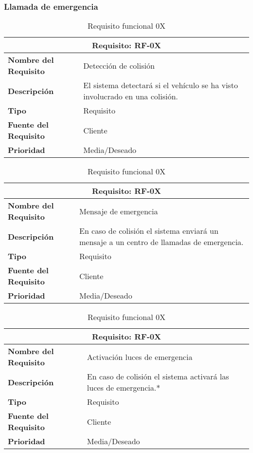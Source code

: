 \documentclass[10pt,a4paper,oldfontcommands]{dpds}
\begin{document}
\subsubsection{Llamada de emergencia}

\begin{table}[H]
\begin{center}
\begin{tabular}{p{} p{7cm}}
\multicolumn{2}{c}{\textbf{Requisito: RF-0X} } \\
\hline \hline
\textbf{Nombre del Requisito} & Detección de colisión\\
\textbf{Descripción} &El sistema detectará si el vehículo se ha visto involucrado en una colisión.\\
\textbf{Tipo} & Requisito  \\
\textbf{Fuente del Requisito} & Cliente  \\
\textbf{Prioridad} & Media/Deseado  \\ \hline
\end{tabular}
\caption{Requisito funcional 0X}
\label{tab:personal}
\end{center}
\end{table}

\begin{table}[H]
\begin{center}
\begin{tabular}{p{} p{7cm}}
\multicolumn{2}{c}{\textbf{Requisito: RF-0X} } \\
\hline \hline
\textbf{Nombre del Requisito} & Mensaje de emergencia\\
\textbf{Descripción} &En caso de colisión el sistema enviará un mensaje a un centro de llamadas de emergencia.\\
\textbf{Tipo} & Requisito  \\
\textbf{Fuente del Requisito} & Cliente  \\
\textbf{Prioridad} & Media/Deseado  \\ \hline
\end{tabular}
\caption{Requisito funcional 0X}
\label{tab:personal}
\end{center}
\end{table}

\begin{table}[H]
\begin{center}
\begin{tabular}{p{} p{7cm}}
\multicolumn{2}{c}{\textbf{Requisito: RF-0X} } \\
\hline \hline
\textbf{Nombre del Requisito} & Activación luces de emergencia\\
\textbf{Descripción} & En caso de colisión el sistema activará las luces de emergencia.*\\
\textbf{Tipo} & Requisito  \\
\textbf{Fuente del Requisito} & Cliente  \\
\textbf{Prioridad} & Media/Deseado  \\ \hline
\end{tabular}
\caption{Requisito funcional 0X}
\label{tab:personal}
\end{center}
\end{table}
\end{document}
